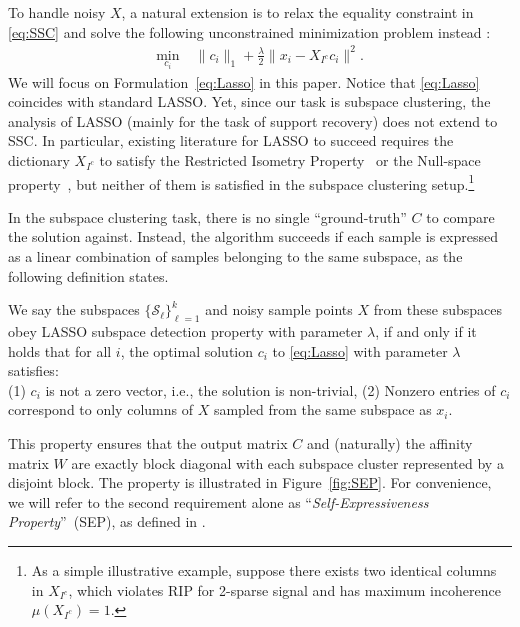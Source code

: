 \documentclass{ctexart}
\begin{document}
To handle noisy $X$, a natural extension is to relax the equality constraint in \eqref{eq:SSC} and solve the following unconstrained minimization problem instead \cite{elhamifar2012ssc_journal}:
\begin{equation}\label{eq:Lasso}
\begin{aligned}
\min_{c_i} \; &\|c_i\|_1+\frac{\lambda}{2}\|x_i-X_{I^c}c_i\|^2.
\end{aligned}
\end{equation}
We will focus on Formulation~\eqref{eq:Lasso} in this paper. Notice that \eqref{eq:Lasso} coincides with standard LASSO. Yet, since our task is subspace clustering, the analysis of LASSO (mainly for the task of support recovery) does not extend to SSC. In particular, existing literature for LASSO to succeed requires the dictionary $X_{I^c}$ to satisfy the Restricted Isometry Property~\cite[RIP for short;][]{candes2008RIP} or the Null-space property~\cite{donoho2006BPDN},  but neither of them is satisfied in the subspace clustering setup.\footnote{As a simple illustrative example, suppose there exists two identical columns in $X_{I^c}$, which violates RIP for 2-sparse signal and has maximum incoherence $\mu(X_{I^c})=1$.}

In the subspace clustering task, there is no single ``ground-truth'' $C$ to compare the solution against. Instead, the algorithm succeeds if each sample is expressed as a linear combination of samples belonging to the same subspace, as the following definition states.
\begin{definition}\label{def:lasso_detection}
We say the subspaces $\{\mathcal{S}_{\ell}\}_{\ell=1}^{k}$ and noisy sample points $X$ from these subspaces obey LASSO subspace detection property with parameter $\lambda$, if and only if it holds that for all $i$, the optimal solution $c_i$ to \eqref{eq:Lasso} with parameter $\lambda$ satisfies:\\
\indent (1) $c_i$ is not a zero vector, i.e., the solution is non-trivial,
\indent (2) Nonzero entries of $c_i$ correspond to only columns of $X$ sampled from the same subspace as $x_i$.
\end{definition}
This property ensures that the output matrix $C$ and (naturally) the affinity matrix $W$ are exactly block diagonal with each subspace cluster represented by a disjoint block.  The property is illustrated in Figure~\ref{fig:SEP}. For convenience, we will refer to the second requirement alone as ``\emph{Self-Expressiveness Property}''~(SEP), as defined in \cite{elhamifar2012ssc_journal}.
\end{document}
